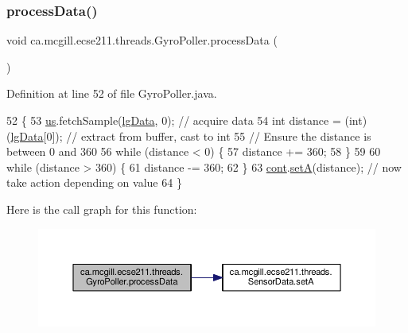 \subsubsection{\texorpdfstring{process\+Data()}{processData()}}
{\footnotesize\ttfamily void ca.\+mcgill.\+ecse211.\+threads.\+Gyro\+Poller.\+process\+Data (\begin{DoxyParamCaption}{ }\end{DoxyParamCaption})\hspace{0.3cm}{\ttfamily [protected]}}



Definition at line 52 of file Gyro\+Poller.\+java.


\begin{DoxyCode}
52                                \{
53     \hyperlink{classca_1_1mcgill_1_1ecse211_1_1threads_1_1_gyro_poller_af478329ec7a335a4f3d2d412d5d10091}{us}.fetchSample(\hyperlink{classca_1_1mcgill_1_1ecse211_1_1threads_1_1_gyro_poller_a112e433b3561e89927357051f55f8cf1}{lgData}, 0); \textcolor{comment}{// acquire data}
54     \textcolor{keywordtype}{int} distance = (int) (\hyperlink{classca_1_1mcgill_1_1ecse211_1_1threads_1_1_gyro_poller_a112e433b3561e89927357051f55f8cf1}{lgData}[0]); \textcolor{comment}{// extract from buffer, cast to int}
55     \textcolor{comment}{// Ensure the distance is between 0 and 360}
56     \textcolor{keywordflow}{while} (distance < 0) \{
57       distance += 360;
58     \}
59 
60     \textcolor{keywordflow}{while} (distance > 360) \{
61       distance -= 360;
62     \}
63     \hyperlink{classca_1_1mcgill_1_1ecse211_1_1threads_1_1_gyro_poller_a90507a3d6038ff7ec7881640b5dd4263}{cont}.\hyperlink{classca_1_1mcgill_1_1ecse211_1_1threads_1_1_sensor_data_a35b1941d44e86b81eb7c625efbd3c8ba}{setA}(distance); \textcolor{comment}{// now take action depending on value}
64   \}
\end{DoxyCode}
Here is the call graph for this function\+:
\nopagebreak
\begin{figure}[H]
\begin{center}
\leavevmode
\includegraphics[width=350pt]{classca_1_1mcgill_1_1ecse211_1_1threads_1_1_gyro_poller_a27f914ed77f23805210998fc0ee2daa7_cgraph}
\end{center}
\end{figure}
